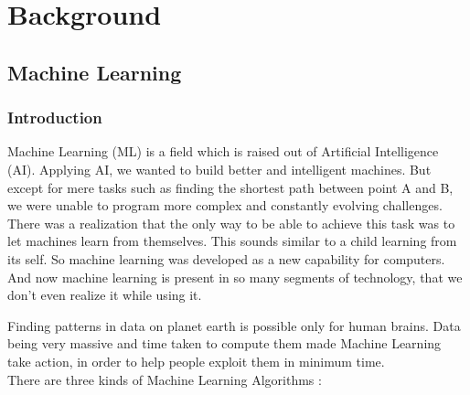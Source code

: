 
 
%  




% 

\chapter{Background}


\section{Machine Learning}

\subsection{Introduction}
Machine Learning (ML) is a field which is raised out of Artificial Intelligence (AI). Applying AI, we wanted to build better and intelligent
machines. But except for mere tasks such as finding the shortest path between point A and B, we were unable to program more complex
and constantly evolving challenges. There was a realization that the only way to be able to achieve this task was to let machines learn
from themselves. This sounds similar to a child learning from its self. So machine learning was developed as a new capability for computers.
And now machine learning is present in so many segments of technology, that we don’t even realize it while using it. \par
Finding patterns in data on planet earth is possible only for human brains. Data being very massive and time taken to compute them made  Machine Learning take  action, in order to help people exploit them in minimum time. \\
There are three kinds of Machine Learning Algorithms :
 
